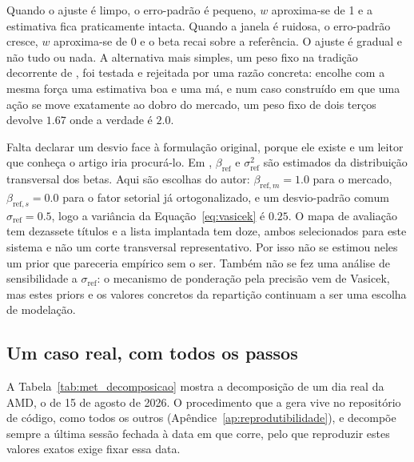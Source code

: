 Quando o ajuste é limpo, o erro-padrão é pequeno, $w$ aproxima-se de 1 e a estimativa fica
praticamente intacta. Quando a janela é ruidosa, o erro-padrão cresce, $w$ aproxima-se de 0 e o beta
recai sobre a referência. O ajuste é gradual e não tudo ou nada. A alternativa mais simples, um peso
fixo na tradição decorrente de \textcite{blume1971risk}, foi testada e rejeitada por uma razão
concreta: encolhe com a mesma força uma estimativa boa e uma má, e num caso construído em que uma
ação se move exatamente ao dobro do mercado, um peso fixo de dois terços devolve $1.67$ onde a
verdade é $2.0$.

Falta declarar um desvio face à formulação original, porque ele existe e um leitor que conheça o
artigo iria procurá-lo. Em \textcite{vasicek1973beta}, $\beta_{\text{ref}}$ e
$\sigma^2_{\text{ref}}$ são estimados da distribuição transversal dos betas. Aqui são escolhas do
autor: $\beta_{\text{ref},m}=1.0$ para o mercado, $\beta_{\text{ref},s}=0.0$ para o fator setorial
já ortogonalizado, e um desvio-padrão comum $\sigma_{\text{ref}}=0.5$, logo a variância da
Equação~\ref{eq:vasicek} é $0.25$. O mapa de avaliação tem dezassete títulos e a lista implantada
tem doze, ambos selecionados para este sistema e não um corte transversal representativo. Por isso
não se estimou neles um prior que pareceria empírico sem o ser. Também não se fez uma análise de
sensibilidade a $\sigma_{\text{ref}}$: o mecanismo de ponderação pela precisão vem de Vasicek, mas
estes priors e os valores concretos da repartição continuam a ser uma escolha de modelação.

\subsection{Um caso real, com todos os passos}

A Tabela~\ref{tab:met_decomposicao} mostra a decomposição de um dia real da AMD, o de 15 de agosto
de 2026. O procedimento que a gera vive no repositório de código, como todos os outros
(Apêndice~\ref{ap:reprodutibilidade}), e decompõe sempre a última sessão fechada à data em que
corre, pelo que reproduzir estes valores exatos exige fixar essa data.

